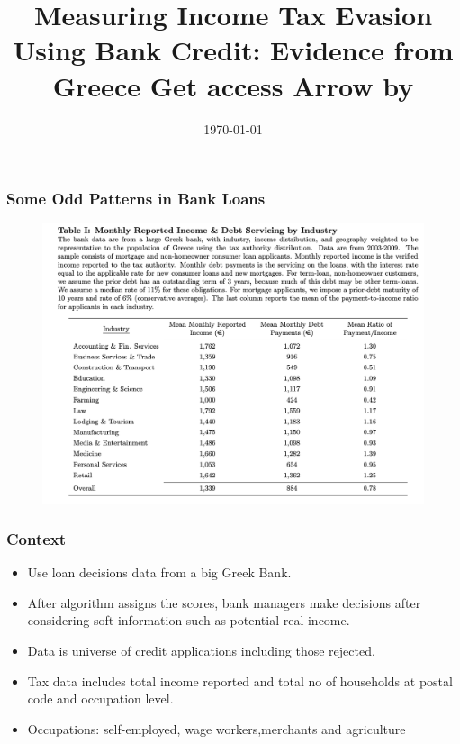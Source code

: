 \documentclass{beamer}
\title{Measuring Income Tax Evasion Using Bank Credit: Evidence from Greece Get access Arrow by \citet{artavanis2016measuring}}
\author{}
\date{\today}
\begin{document}
\frame{\titlepage}

\begin{frame}
\frametitle{Some Odd Patterns in Bank Loans}
\begin{figure}
    \centering
    \includegraphics[width=\textwidth]{Paper Presentations/Table1.png}
\end{figure}
\end{frame}


\begin{frame}
\frametitle{Context }
\begin{itemize}
    \item Use loan decisions data from a big Greek Bank.
    \item After algorithm assigns the scores, bank managers make decisions after considering soft information such as potential real income.
    \item Data is universe of credit applications including those rejected.
    \item Tax data includes total income reported and total no of households at postal code and occupation level.
    \item Occupations: self-employed, wage workers,merchants and agriculture
    
\end{itemize}
\end{frame}
\end{document}
